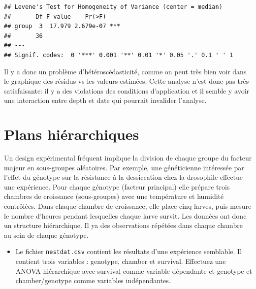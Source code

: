 \documentclass[
  12pt,
]{book}
\newenvironment{Shaded}{\begin{snugshade}}{\end{snugshade}}
\newcommand{\DataTypeTok}[1]{\textcolor[rgb]{0.13,0.29,0.53}{#1}}
\newcommand{\KeywordTok}[1]{\textcolor[rgb]{0.13,0.29,0.53}{\textbf{#1}}}
\newcommand{\NormalTok}[1]{#1}
\newcommand{\OperatorTok}[1]{\textcolor[rgb]{0.81,0.36,0.00}{\textbf{#1}}}
\newcommand{\StringTok}[1]{\textcolor[rgb]{0.31,0.60,0.02}{#1}}
\providecommand{\tightlist}{%
  \setlength{\itemsep}{0pt}\setlength{\parskip}{0pt}}
\begin{document}
\begin{verbatim}
## Levene's Test for Homogeneity of Variance (center = median)
##       Df F value    Pr(>F)    
## group  3  17.979 2.679e-07 ***
##       36                      
## ---
## Signif. codes:  0 '***' 0.001 '**' 0.01 '*' 0.05 '.' 0.1 ' ' 1
\end{verbatim}

Il y a donc un problème d'hétéroscédasticité, comme on peut très bien voir dans le graphique des résidus vs les valeurs estimées. Cette analyse n'est donc pas très satisfaisante: il y a des violations des conditions d'application et il semble y avoir une interaction entre depth et date qui pourrait invalider l'analyse.

\hypertarget{plans-hiuxe9rarchiques}{%
\section{Plans hiérarchiques}\label{plans-hiuxe9rarchiques}}

Un design expérimental fréquent implique la division de chaque groupe du facteur majeur en sous-groupes aléatoires. Par exemple, une généticienne intéressée par l'effet du génotype sur la résistance à la dessiccation chez la drosophile effectue une expérience. Pour chaque génotype (facteur principal) elle prépare trois chambres de croissance (sous-groupes) avec une température et humidité contrôlées. Dans chaque chambre de croissance, elle place cinq larves, puis mesure le nombre d'heures pendant lesquelles chaque larve survit. Les données ont donc un structure hiérarchique. Il ya des observations répétées dans chaque chambre au sein de chaque génotype.

\begin{itemize}
\tightlist
\item
  Le fichier \texttt{nestdat.csv} contient les résultats d'une expérience semblable. Il contient trois variables : genotype, chamber et survival. Effectuez une ANOVA hiérarchique avec survival comme variable dépendante et genotype et chamber/genotype comme variables indépendantes.
\end{itemize}

\begin{Shaded}
\end{Shaded}
\end{document}
